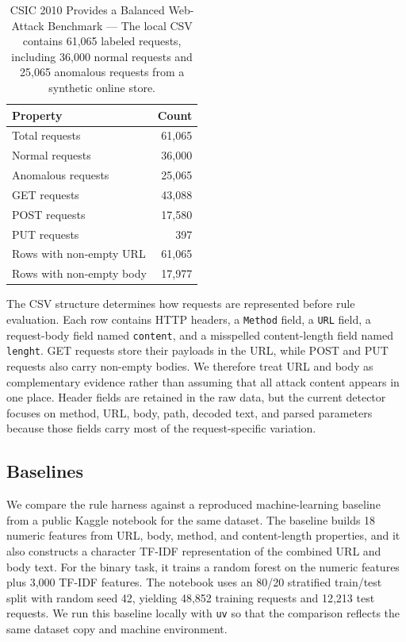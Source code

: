 \documentclass[letterpaper,twocolumn,10pt]{article}
\begin{document}
\begin{table}[t]
\centering
\begin{tabular}{lr}
\toprule
Property & Count \\
\midrule
Total requests & 61{,}065 \\
Normal requests & 36{,}000 \\
Anomalous requests & 25{,}065 \\
GET requests & 43{,}088 \\
POST requests & 17{,}580 \\
PUT requests & 397 \\
Rows with non-empty URL & 61{,}065 \\
Rows with non-empty body & 17{,}977 \\
\bottomrule
\end{tabular}
\caption{CSIC 2010 Provides a Balanced Web-Attack Benchmark --- The local CSV contains 61{,}065 labeled requests, including 36{,}000 normal requests and 25{,}065 anomalous requests from a synthetic online store.}
\label{tab:dataset-summary}
\end{table}

The CSV structure determines how requests are represented before rule evaluation. Each row contains HTTP headers, a \texttt{Method} field, a \texttt{URL} field, a request-body field named \texttt{content}, and a misspelled content-length field named \texttt{lenght}. GET requests store their payloads in the URL, while POST and PUT requests also carry non-empty bodies. We therefore treat URL and body as complementary evidence rather than assuming that all attack content appears in one place. Header fields are retained in the raw data, but the current detector focuses on method, URL, body, path, decoded text, and parsed parameters because those fields carry most of the request-specific variation.

\subsection{Baselines}

We compare the rule harness against a reproduced machine-learning baseline from a public Kaggle notebook for the same dataset. The baseline builds 18 numeric features from URL, body, method, and content-length properties, and it also constructs a character TF-IDF representation of the combined URL and body text. For the binary task, it trains a random forest on the numeric features plus 3{,}000 TF-IDF features. The notebook uses an 80/20 stratified train/test split with random seed 42, yielding 48{,}852 training requests and 12{,}213 test requests. We run this baseline locally with \texttt{uv} so that the comparison reflects the same dataset copy and machine environment.
\end{document}
